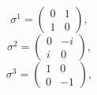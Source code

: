 \begin{equation}
    \sigma^1=\begin{pmatrix}
        0 & 1 \\
        1 & 0
    \end{pmatrix},
\end{equation}
\begin{equation}
    \sigma^2=\begin{pmatrix}
        0 & -i \\
        i & 0
    \end{pmatrix},
\end{equation}
\begin{equation}
    \sigma^3=\begin{pmatrix}
        1 & 0 \\
        0 & -1
    \end{pmatrix},
\end{equation}

